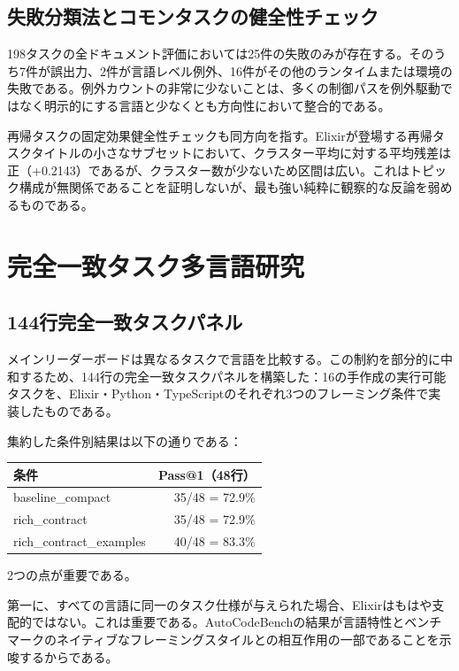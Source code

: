 \documentclass[11pt]{article}
\makeatletter
\newcommand{\acb}{AutoCodeBench}
\newcommand{\passatone}{Pass@1}
\newcommand{\elixir}{Elixir}
\newcommand{\pythonlang}{Python}
\newcommand{\tslang}{TypeScript}
\makeatother
\begin{document}
\subsection{失敗分類法とコモンタスクの健全性チェック}

198タスクの全ドキュメント評価においては25件の失敗のみが存在する。そのうち7件が誤出力、2件が言語レベル例外、16件がその他のランタイムまたは環境の失敗である。例外カウントの非常に少ないことは、多くの制御パスを例外駆動ではなく明示的にする言語と少なくとも方向性において整合的である。

再帰タスクの固定効果健全性チェックも同方向を指す。\elixir{}が登場する再帰タスクタイトルの小さなサブセットにおいて、クラスター平均に対する平均残差は正（+0.2143）であるが、クラスター数が少ないため区間は広い。これはトピック構成が無関係であることを証明しないが、最も強い純粋に観察的な反論を弱めるものである。

\section{完全一致タスク多言語研究}

\subsection{144行完全一致タスクパネル}

メインリーダーボードは異なるタスクで言語を比較する。この制約を部分的に中和するため、144行の完全一致タスクパネルを構築した：16の手作成の実行可能タスクを、\elixir{}・\pythonlang{}・\tslang{}のそれぞれ3つのフレーミング条件で実装したものである。

集約した条件別結果は以下の通りである：
\begin{center}
\begin{tabular}{lr}
\toprule
条件 & \passatone{}（48行） \\
\midrule
baseline\_compact & 35/48 = 72.9\% \\
rich\_contract & 35/48 = 72.9\% \\
rich\_contract\_examples & 40/48 = 83.3\% \\
\bottomrule
\end{tabular}
\end{center}

2つの点が重要である。

第一に、すべての言語に同一のタスク仕様が与えられた場合、\elixir{}はもはや支配的ではない。これは重要である。\acb{}の結果が言語特性とベンチマークのネイティブなフレーミングスタイルとの相互作用の一部であることを示唆するからである。
\end{document}
